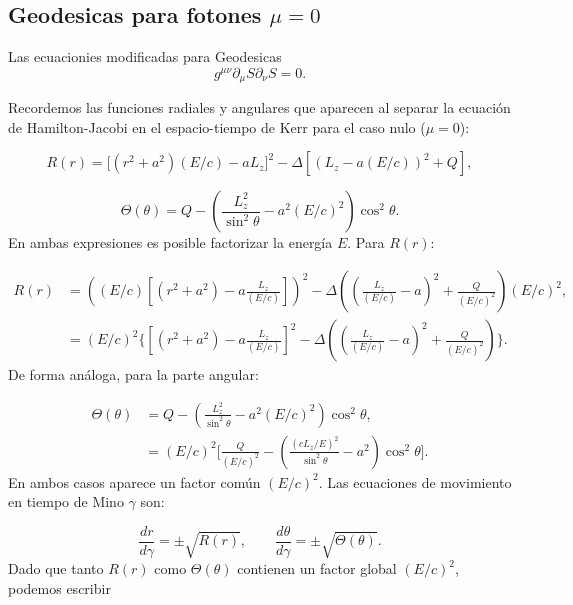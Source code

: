 \subsection{Geodesicas para fotones $\mu =0 $}
Las ecuacionies modificadas para Geodesicas
\begin{equation}
    g^{\mu \nu} \partial_\mu S \partial_\nu S= 0.
\end{equation}


Recordemos las funciones radiales y angulares que aparecen al separar la ecuación de Hamilton-Jacobi en el espacio-tiempo de Kerr para el caso nulo (\(\mu=0\)):

\begin{equation}
R(r) = \big[(r^2+a^2)(E/c) - aL_z\big]^2 - \Delta \left[ (L_z - a(E/c))^2 + Q \right],
\end{equation}

\begin{equation}
\Theta(\theta) = Q - \left( \frac{L_z^2}{\sin^2\theta} - a^2(E/c)^2 \right)\cos^2\theta.
\end{equation}
En ambas expresiones es posible factorizar la energía \(E\). Para \(R(r)\):

\begin{align}
R(r) &= \left( (E/c) \left[ (r^2+a^2) - a\frac{L_z}{ (E/c) } \right]\right)^2
- \Delta\left( \left(\frac{L_z}{(E/c)}-a\right)^2 + \frac{Q}{(E/c)^2} \right) (E/c)^2, \\
&= (E/c)^2 \Bigg\{ \left[ (r^2+a^2) - a\frac{L_z}{(E/c)} \right]^2 
- \Delta\left( \left(\frac{L_z}{(E/c)}-a\right)^2 + \frac{Q}{(E/c)^2} \right) \Bigg\}.
\end{align}
De forma análoga, para la parte angular:

\begin{align}
\Theta(\theta) &= Q - \left( \frac{L_z^2}{\sin^2\theta} - a^2 (E/c) ^2 \right)\cos^2\theta, \\
&= (E/c)^2 \Bigg[ \frac{Q}{(E/c)^2} 
- \left( \frac{(c L_z/E)^2}{\sin^2\theta} - a^2 \right)\cos^2\theta \Bigg].
\end{align}
En ambos casos aparece un factor común \((E/c)^2\).
Las ecuaciones de movimiento en tiempo de Mino \(\gamma\) son:

\begin{equation}
\frac{dr}{d\gamma} = \pm \sqrt{R(r)}, \qquad
\frac{d\theta}{d\gamma} = \pm \sqrt{\Theta(\theta)}.
\end{equation}
Dado que tanto \(R(r)\) como \(\Theta(\theta)\) contienen un factor global \((E/c)^2\), 
podemos escribir

